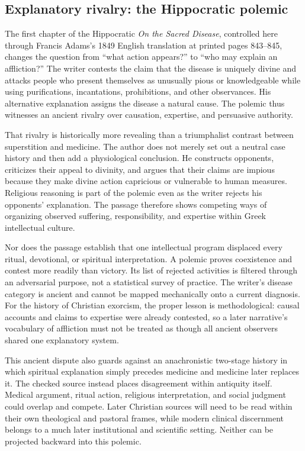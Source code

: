 \subsection{Explanatory rivalry: the Hippocratic polemic}

The first chapter of the Hippocratic \emph{On the Sacred Disease}, controlled
here through Francis Adams's 1849 English translation at printed pages
843--845, changes the question from ``what action appears?'' to ``who may
explain an affliction?'' The writer contests the claim that the disease is
uniquely divine and attacks people who present themselves as unusually pious
or knowledgeable while using purifications, incantations, prohibitions, and
other observances. His alternative explanation assigns the disease a natural
cause. The polemic thus witnesses an ancient rivalry over causation,
expertise, and persuasive authority.

That rivalry is historically more revealing than a triumphalist contrast
between superstition and medicine. The author does not merely set out a
neutral case history and then add a physiological conclusion. He constructs
opponents, criticizes their appeal to divinity, and argues that their claims
are impious because they make divine action capricious or vulnerable to human
measures. Religious reasoning is part of the polemic even as the writer
rejects his opponents' explanation. The passage therefore shows competing
ways of organizing observed suffering, responsibility, and expertise within
Greek intellectual culture.

Nor does the passage establish that one intellectual program displaced every
ritual, devotional, or spiritual interpretation. A polemic proves coexistence
and contest more readily than victory. Its list of rejected activities is
filtered through an adversarial purpose, not a statistical survey of practice.
The writer's disease category is ancient and cannot be mapped mechanically
onto a current diagnosis. For the history of Christian exorcism, the proper
lesson is methodological: causal accounts and claims to expertise were already
contested, so a later narrative's vocabulary of affliction must not be treated
as though all ancient observers shared one explanatory system.

This ancient dispute also guards against an anachronistic two-stage history in
which spiritual explanation simply precedes medicine and medicine later
replaces it. The checked source instead places disagreement within antiquity
itself. Medical argument, ritual action, religious interpretation, and social
judgment could overlap and compete. Later Christian sources will need to be
read within their own theological and pastoral frames, while modern clinical
discernment belongs to a much later institutional and scientific setting.
Neither can be projected backward into this polemic.

